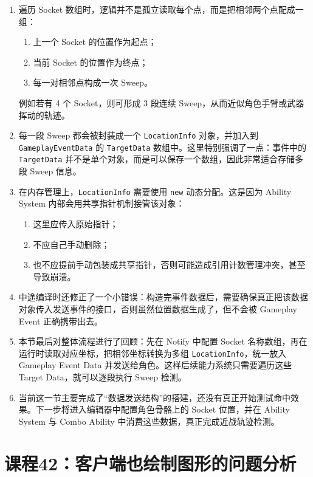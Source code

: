 \begin{enumerate}
	\item 遍历 Socket 数组时，逻辑并不是孤立读取每个点，而是把相邻两个点配成一组：
	\begin{enumerate}
		\item 上一个 Socket 的位置作为起点；
		\item 当前 Socket 的位置作为终点；
		\item 每一对相邻点构成一次 Sweep。
	\end{enumerate}
	例如若有 4 个 Socket，则可形成 3 段连续 Sweep，从而近似角色手臂或武器挥动的轨迹。
	
	\item 每一段 Sweep 都会被封装成一个 \texttt{LocationInfo} 对象，并加入到 \texttt{GameplayEventData} 的 \texttt{TargetData} 数组中。这里特别强调了一点：事件中的 \texttt{TargetData} 并不是单个对象，而是可以保存一个数组，因此非常适合存储多段 Sweep 信息。
	
	\item 在内存管理上，\texttt{LocationInfo} 需要使用 \texttt{new} 动态分配。这是因为 Ability System 内部会用共享指针机制接管该对象：
	\begin{enumerate}
		\item 这里应传入原始指针；
		\item 不应自己手动删除；
		\item 也不应提前手动包装成共享指针，否则可能造成引用计数管理冲突，甚至导致崩溃。
	\end{enumerate}
	
	\item 中途编译时还修正了一个小错误：构造完事件数据后，需要确保真正把该数据对象传入发送事件的接口，否则虽然位置数据生成了，但不会被 Gameplay Event 正确携带出去。
	
	\item 本节最后对整体流程进行了回顾：先在 Notify 中配置 Socket 名称数组，再在运行时读取对应坐标，把相邻坐标转换为多组 \texttt{LocationInfo}，统一放入 Gameplay Event Data 并发送给角色。这样后续能力系统只需要遍历这些 Target Data，就可以逐段执行 Sweep 检测。
	
	\item 当前这一节主要完成了“数据发送结构”的搭建，还没有真正开始测试命中效果。下一步将进入编辑器中配置角色骨骼上的 Socket 位置，并在 Ability System 与 Combo Ability 中消费这些数据，真正完成近战轨迹检测。
\end{enumerate}

\section{课程42：客户端也绘制图形的问题分析}

